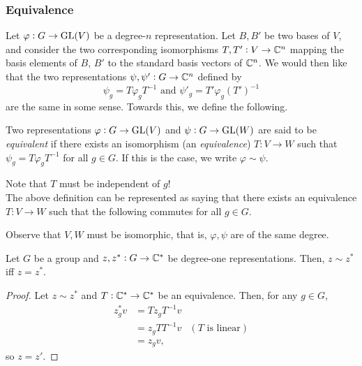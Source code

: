 		\subsubsection{Equivalence}

			Let $\varphi : G \to \operatorname{GL}(V)$ be a degree-$n$ representation. Let $B,B'$ be two bases of $V$, and consider the two corresponding isomorphisms $T,T' : V \to \mathbb{C}^n$ mapping the basis elements of $B$, $B'$ to the standard basis vectors of $\mathbb{C}^n$. We would then like that the two representations $\psi,\psi' : G \to \mathbb{C}^n$ defined by
			\[ \psi_g = T\varphi_gT^{-1} \text{ and } \psi'_g = T'\varphi_g(T')^{-1} \]
			are the same in some sense. Towards this, we define the following.

			\begin{fdef}
				Two representations $\varphi : G \to \operatorname{GL}(V)$ and $\psi : G \to \operatorname{GL}(W)$ are said to be \emph{equivalent} if there exists an isomorphism (an \emph{equivalence}) $T : V \to W$ such that $\psi_g = T\varphi_gT^{-1}$ for all $g \in G$. If this is the case, we write $\varphi \sim \psi$.
			\end{fdef}

			Note that $T$ must be independent of $g$!\\
			The above definition can be represented as saying that there exists an equivalence $T : V \to W$ such that the following commutes for all $g \in G$.
			\begin{center}
			\end{center}

			Observe that $V,W$ must be isomorphic, that is, $\varphi,\psi$ are of the same degree.

			\begin{prop}
				Let $G$ be a group and $z,z^* : G \to \mathbb{C}^*$ be degree-one representations. Then, $z \sim z^*$ iff $z = z^*$.
			\end{prop}
			\begin{proof}
				Let $z \sim z^*$ and $T : \mathbb{C}^* \to \mathbb{C}^*$ be an equivalence. Then, for any $g \in G$,
				\begin{align*}
					z^*_gv &= Tz_gT^{-1}v \\
						&= z_g TT^{-1}v & (T\text{ is linear}) \\
						&= z_gv,
				\end{align*}
				so $z = z'$.
			\end{proof}

